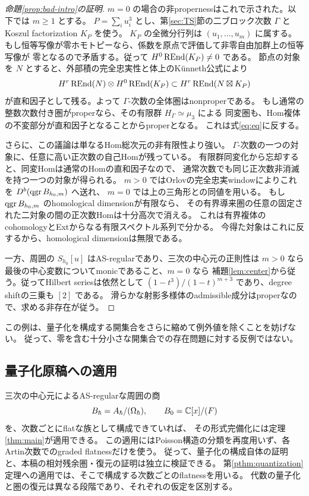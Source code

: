 \begin{proof}[命題\ref{prop:bad-intro}の証明]
 \(m=0\) の場合の非propernessはこれで示された。以下では \(m\ge1\) とする。
 \(P=\sum_i u_i^3\) とし、第\ref{sec:TS}節の二ブロック次数 \(\Gamma\) と
 Koszul factorization \(K_P\) を使う。
 \(K_P\) の全微分行列は \((u_1,\ldots,u_m)\) に属する。
 もし恒等写像が零ホモトピーなら、係数を原点で評価して非零自由加群上の恒等写像が
 零となるので矛盾する。従って \(H^0\operatorname{REnd}(K_P)\ne0\) である。
 節点の対象を \(N\) とすると、外部積の完全忠実性と体上のKünneth公式により
 \[
 H^r\operatorname{REnd}(N)\otimes H^0\operatorname{REnd}(K_P)
 \subset H^r\operatorname{REnd}(N\boxtimes K_P)
 \]
 が直和因子として残る。よって \(\Gamma\)-次数の全体圏はnonproperである。
 もし通常の整数次数付き圏がproperなら、その有限群 \(H_\Gamma\simeq\mu_3\) による
 同変圏も、Hom複体の不変部分が直和因子となることからproperとなる。
 これは式\eqref{eq:eq}に反する。

 さらに、この議論は単なるHom総次元の非有限性より強い。
 \(\Gamma\)-次数の一つの対象に、任意に高い正次数の自己Homが残っている。
 有限群同変化から忘却すると、同変Homは通常のHomの直和因子なので、
 通常次数でも同じ正次数非消滅を持つ一つの対象が得られる。
 \(m>0\) ではOrlovの完全忠実windowによりこれを \(D^b(\operatorname{qgr} B_{h_0,m})\) へ送れ、
 \(m=0\) では上の三角形との同値を用いる。
 もし \(\operatorname{qgr} B_{h_0,m}\) のhomological dimensionが有限なら、
 その有界導来圏の任意の固定された二対象の間の正次数Homは十分高次で消える。
 これは有界複体のcohomologyとExtからなる有限スペクトル系列で分かる。
 今得た対象はこれに反するから、homological dimensionは無限である。

 一方、周囲の \(S_{h_0}[u]\) はAS-regularであり、三次の中心元の正則性は
 \(m>0\) なら最後の中心変数についてmonicであること、\(m=0\) なら
 補題\ref{lem:center}から従う。従ってHilbert seriesは依然として
 \((1-t^3)/(1-t)^{m+3}\) であり、degree shiftの三乗も \([2]\) である。
 滑らかな射影多様体のadmissible成分はproperなので、求める非存在が従う。
\end{proof}

この例は、量子化を構成する開集合をさらに縮めて例外値を除くことを妨げない。
従って、零を含む十分小さな開集合での存在問題に対する反例ではない。

\subsection{量子化原稿への適用}

三次の中心元によるAS-regularな周囲の商
\[
 B_\hbar=A_\hbar/(\Omega_\hbar),\qquad B_0=\mathbb C[x]/(F)
\]
を、次数ごとにflatな族として構成できていれば、
その形式完備化には定理\ref{thm:main}が適用できる。
この適用にはPoisson構造の分類を再度用いず、各Artin次数でのgraded flatnessだけを使う。
従って、量子化の構成自体の証明と、本稿の相対残余圏・復元の証明は独立に検証できる。
第\ref{pthm:quantization}定理への適用では、そこで構成する次数ごとのflatnessを用いる。
代数の量子化と圏の復元は異なる段階であり、それぞれの仮定を区別する。

